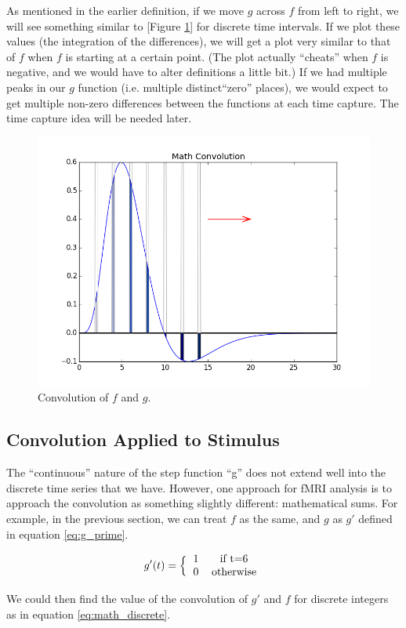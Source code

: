 \documentclass[11pt]{article}
\begin{document}
As mentioned in the earlier definition, if we move $g$ across $f$ from 
left to right, we will see something similar to [Figure \ref{fig:math}] for 
discrete time intervals. If we plot these values (the integration of the 
differences), we will get a plot very similar to that of $f$ when $f$ is 
starting at a certain point. (The plot actually ``cheats'' when $f$ is 
negative, and we would have to alter definitions a little bit.) If we had 
multiple peaks in our $g$ function (i.e. multiple distinct``zero'' places), we 
would expect to get multiple non-zero differences between the functions at each 
time capture. The time capture idea will be needed later.  

\begin{figure}[ht]
	\centering
	\includegraphics[width=.5\linewidth]{images/math_convolved.png}
	\caption{Convolution of $f$ and $g$.}
	\label{fig:math}
\end{figure}


\subsection{Convolution Applied to Stimulus}

The ``continuous'' nature of the step function ``g'' does not extend well into 
the discrete time series that we have. However, one approach for fMRI analysis 
is to approach the convolution as something slightly different: mathematical 
sums. For example, in the previous section, we can treat $f$ as the same, and 
$g$ as $g'$ defined in equation \ref{eq:g_prime}.

\begin{equation}\label{eq:g_prime}
 g'(t)=\Big \{ \begin{tabular}{l c}
 		1  & if t=6\\
 		0  & otherwise \\
 		\end{tabular} \end{equation}

We could then find the value of the convolution of $g'$ and $f$ for discrete 
integers as in equation \ref{eq:math_discrete}.
\end{document}
